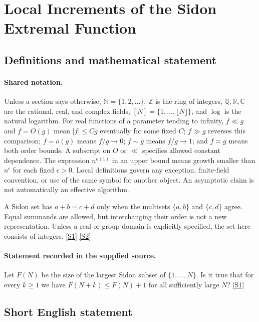\documentclass[11pt,a4paper]{article}
\newcommand{\N}{\mathbb{N}}
\newcommand{\Z}{\mathbb{Z}}
\newcommand{\Q}{\mathbb{Q}}
\newcommand{\R}{\mathbb{R}}
\newcommand{\C}{\mathbb{C}}
\newcommand{\sref}[2]{\hyperlink{source:#1:#2}{[S#2]}}
\begin{document}
\section{Local Increments of the Sidon Extremal Function}\label{statement}


\subsection{Definitions and mathematical statement}

\paragraph{Shared notation.}Unless a section says otherwise, $\N=\{1,2,\ldots\}$,
$\Z$ is the ring of integers, $\Q,\R,\C$ are the rational, real, and complex
fields, $[N]=\{1,\ldots,\lfloor N\rfloor\}$, and $\log$ is the natural
logarithm. For real functions of a parameter tending to infinity,
$f\ll g$ and $f=O(g)$ mean $|f|\leq Cg$ eventually for some fixed $C$;
$f\gg g$ reverses this comparison; $f=o(g)$ means $f/g\to0$;
$f\sim g$ means $f/g\to1$; and $f\asymp g$ means both order bounds.
A subscript on $O$ or $\ll$ specifies allowed constant dependence.
The expression $n^{o(1)}$ in an upper bound means growth smaller than
$n^\epsilon$ for each fixed $\epsilon>0$. Local definitions govern any
exception, finite-field convention, or use of the same symbol for another
object. An asymptotic claim is not automatically an effective algorithm.



A Sidon set has $a+b=c+d$ only when the multisets $\{a,b\}$ and $\{c,d\}$ agree. Equal summands are allowed, but interchanging their order is not a new representation. Unless a real or group domain is explicitly specified, the set here consists of integers. \sref{statement}{1} \sref{statement}{2}

\paragraph{Statement recorded in the supplied source.}
Let $F(N)$ be the size of the largest Sidon subset of $\{1,\ldots,N\}$. Is it true that for every $k\geq 1$ we have $ F(N+k)\leq F(N)+1 $ for all sufficiently large $N$? \sref{statement}{1}

\subsection{Short English statement}
\end{document}
